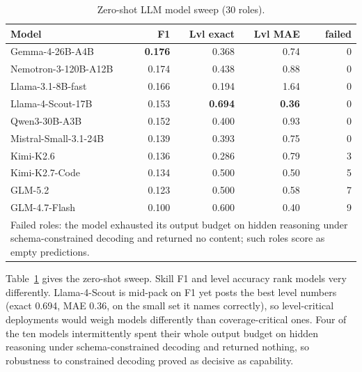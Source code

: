 \documentclass[conference]{IEEEtran}
\begin{document}
\begin{table}
\centering
\caption{Zero-shot LLM model sweep (30 roles).}
\label{tab:sweep-llm}
\footnotesize
\setlength{\tabcolsep}{3.5pt}
\begin{tabularx}{\linewidth}{Xrrrr}
\toprule
\textbf{Model} & \textbf{F1} & \textbf{Lvl exact} & \textbf{Lvl MAE} & \textbf{failed}\\
\midrule
Gemma-4-26B-A4B & \textbf{0.176} & 0.368 & 0.74 & 0\\
Nemotron-3-120B-A12B & 0.174 & 0.438 & 0.88 & 0\\
Llama-3.1-8B-fast & 0.166 & 0.194 & 1.64 & 0\\
Llama-4-Scout-17B & 0.153 & \textbf{0.694} & \textbf{0.36} & 0\\
Qwen3-30B-A3B & 0.152 & 0.400 & 0.93 & 0\\
Mistral-Small-3.1-24B & 0.139 & 0.393 & 0.75 & 0\\
Kimi-K2.6 & 0.136 & 0.286 & 0.79 & 3\\
Kimi-K2.7-Code & 0.134 & 0.500 & 0.50 & 5\\
GLM-5.2 & 0.123 & 0.500 & 0.58 & 7\\
GLM-4.7-Flash & 0.100 & 0.600 & 0.40 & 9\\
\bottomrule
\multicolumn{5}{p{0.95\linewidth}}{\footnotesize Failed roles: the model exhausted its output budget on hidden reasoning under schema-constrained decoding and returned no content; such roles score as empty predictions.}\\
\end{tabularx}
\end{table}

Table~\ref{tab:sweep-llm} gives the zero-shot sweep. Skill F1 and level accuracy rank models very differently. Llama-4-Scout is mid-pack on F1 yet posts the best level numbers (exact 0.694, MAE 0.36, on the small set it names correctly), so level-critical deployments would weigh models differently than coverage-critical ones. Four of the ten models intermittently spent their whole output budget on hidden reasoning under schema-constrained decoding and returned nothing, so robustness to constrained decoding proved as decisive as capability.
\end{document}
